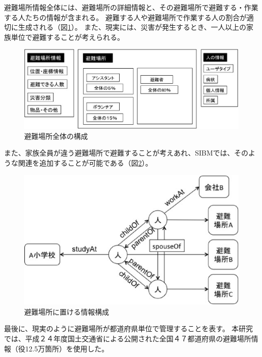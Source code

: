 避難場所情報全体には、避難場所の詳細情報と、その避難場所で避難する・作業する人たちの情報が含まれる。
避難する人や避難場所で作業する人の割合が適切に生成される（図\ref{fig:sibm_shelter}）。
また、現実には、災害が発生するとき、一人以上の家族単位で避難することが考えられる。

\begin{figure}[h!]
 	\begin{center}
 		\includegraphics[width=135mm]{./images/sibm_fullimage.eps}
 		\caption{避難場所全体の構成}
 		\label{fig:sibm_shelter}
 	\end{center}
\end{figure}

また、家族全員が違う避難場所で避難することが考えあれ、SIBMでは、そのような関連を追加することが可能である（図\ref{fig:sibm_relationship}）。

\begin{figure}[h!]
 	\begin{center}
 		\includegraphics[width=135mm]{./images/sibm_relation.eps}
 		\caption{避難場所に置ける情報構成}
 		\label{fig:sibm_relationship}
 	\end{center}
\end{figure}

最後に、現実のように避難場所が都道府県単位で管理することを表す。
本研究では、平成２４年度国土交通省による公開された全国４７都道府県の避難場所情報（役12.5万箇所）を使用した。


